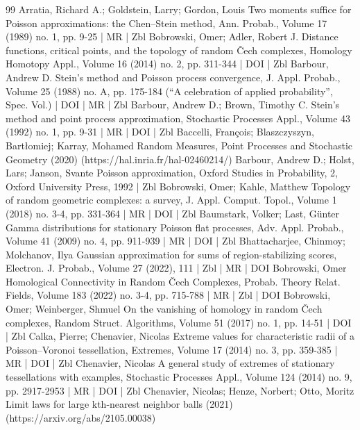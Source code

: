 \begin{thebibliography}{99}
Arratia, Richard A.; Goldstein, Larry; Gordon, Louis Two moments suffice for Poisson approximations: the Chen–Stein method, Ann. Probab., Volume 17 (1989) no. 1, pp. 9-25 | MR | Zbl
Bobrowski, Omer; Adler, Robert J. Distance functions, critical points, and the topology of random Čech complexes, Homology Homotopy Appl., Volume 16 (2014) no. 2, pp. 311-344 | DOI | Zbl
Barbour, Andrew D. Stein’s method and Poisson process convergence, J. Appl. Probab., Volume 25 (1988) no. A, pp. 175-184 (“A celebration of applied probability”, Spec. Vol.) | DOI | MR | Zbl
Barbour, Andrew D.; Brown, Timothy C. Stein’s method and point process approximation, Stochastic Processes Appl., Volume 43 (1992) no. 1, pp. 9-31 | MR | DOI | Zbl
Baccelli, François; Blaszczyszyn, Bartłomiej; Karray, Mohamed Random Measures, Point Processes and Stochastic Geometry (2020) (https://hal.inria.fr/hal-02460214/)
Barbour, Andrew D.; Holst, Lars; Janson, Svante Poisson approximation, Oxford Studies in Probability, 2, Oxford University Press, 1992 | Zbl
Bobrowski, Omer; Kahle, Matthew Topology of random geometric complexes: a survey, J. Appl. Comput. Topol., Volume 1 (2018) no. 3-4, pp. 331-364 | MR | DOI | Zbl
Baumstark, Volker; Last, Günter Gamma distributions for stationary Poisson flat processes, Adv. Appl. Probab., Volume 41 (2009) no. 4, pp. 911-939 | MR | DOI | Zbl
Bhattacharjee, Chinmoy; Molchanov, Ilya Gaussian approximation for sums of region-stabilizing scores, Electron. J. Probab., Volume 27 (2022), 111 | Zbl | MR | DOI
Bobrowski, Omer Homological Connectivity in Random Čech Complexes, Probab. Theory Relat. Fields, Volume 183 (2022) no. 3-4, pp. 715-788 | MR | Zbl | DOI
Bobrowski, Omer; Weinberger, Shmuel On the vanishing of homology in random Čech complexes, Random Struct. Algorithms, Volume 51 (2017) no. 1, pp. 14-51 | DOI | Zbl
Calka, Pierre; Chenavier, Nicolas Extreme values for characteristic radii of a Poisson–Voronoi tessellation, Extremes, Volume 17 (2014) no. 3, pp. 359-385 | MR | DOI | Zbl
Chenavier, Nicolas A general study of extremes of stationary tessellations with examples, Stochastic Processes Appl., Volume 124 (2014) no. 9, pp. 2917-2953 | MR | DOI | Zbl
Chenavier, Nicolas; Henze, Norbert; Otto, Moritz Limit laws for large kth-nearest neighbor balls (2021) (https://arxiv.org/abs/2105.00038)

\end{thebibliography}
